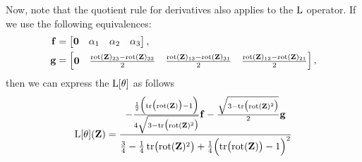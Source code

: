 Now, note that the quotient rule for derivatives also applies to the $\operatorname{L}$ operator. If we use the following equivalences:
\begin{align}
    \mathbf{f} &= \begin{bmatrix}
        \mathbf{0}& \alpha_1 & \alpha_2 & \alpha_3
    \end{bmatrix},\\
    \mathbf{g} &= \begin{bmatrix}
        \mathbf{0}& \frac{\operatorname{rot}(\mathbf{Z})_{23}-\operatorname{rot}(\mathbf{Z})_{32}}{2} & \frac{\operatorname{rot}(\mathbf{Z})_{13} - \operatorname{rot}(\mathbf{Z})_{31}}{2} & \frac{\operatorname{rot}(\mathbf{Z})_{12}-\operatorname{rot}(\mathbf{Z})_{21}}{2}
    \end{bmatrix},
\end{align}
then we can express the $\operatorname{L}[\theta]$ as follows
\begin{align}
    \text{L}[\theta](\mathbf{Z}) = \frac{
        -\frac{\frac{1}{2}\Bigl(\operatorname{tr}\bigl(\operatorname{rot}(\mathbf{Z})\bigr)-1\Bigr)}{4\sqrt{3 - \operatorname{tr}\bigl(\operatorname{rot}(\mathbf{Z})^2\bigr)}}\mathbf{f} -
    \frac{\sqrt{3 - \operatorname{tr}\bigl(\operatorname{rot}(\mathbf{Z})^2\bigr)}}{2}\mathbf{g}}
    {\frac{3}{4} - \frac{1}{4}\operatorname{tr}\bigl(\operatorname{rot}(\mathbf{Z})^2\bigr)+\frac{1}{4}\Bigl(\operatorname{tr}\bigl(\operatorname{rot}(\mathbf{Z})\bigr)-1\Bigr)^2} 
\end{align}

